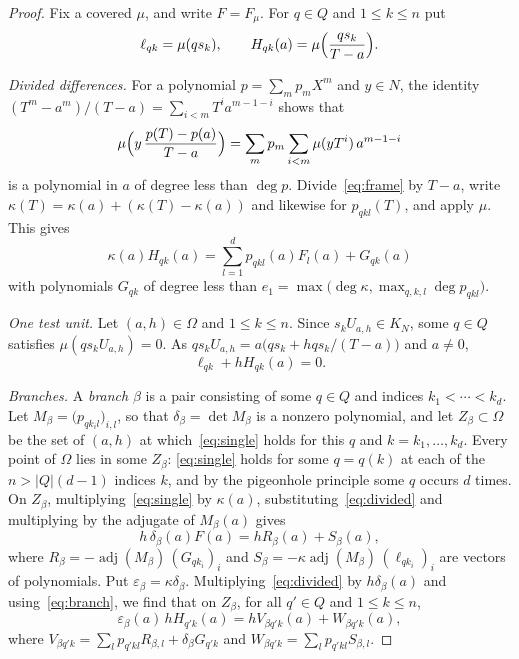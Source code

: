 \documentclass[10pt]{article}
\theoremstyle{remark}
\DeclareMathOperator{\adj}{adj}
\begin{document}
\begin{proof}
Fix a covered $\mu$, and write $F=F_\mu$. For $q\in Q$ and $1\le k\le n$ put
\[
 \ell_{qk}=\mu(qs_k),\qquad H_{qk}(a)=\mu\Bigl(\frac{qs_k}{T-a}\Bigr).
\]

\emph{Divided differences.} For a polynomial $p=\sum_m p_mX^m$ and $y\in N$, the identity $(T^m-a^m)/(T-a)=\sum_{i<m}T^ia^{m-1-i}$ shows that
\[
 \mu\Bigl(y\,\frac{p(T)-p(a)}{T-a}\Bigr)=\sum_m p_m\sum_{i<m}\mu(yT^i)\,a^{m-1-i}
\]
is a polynomial in $a$ of degree less than $\deg p$. Divide~\eqref{eq:frame} by $T-a$, write $\kappa(T)=\kappa(a)+(\kappa(T)-\kappa(a))$ and likewise for $p_{qkl}(T)$, and apply $\mu$. This gives
\begin{equation}\label{eq:divided}
 \kappa(a)H_{qk}(a)=\sum_{l=1}^dp_{qkl}(a)F_l(a)+G_{qk}(a)
\end{equation}
with polynomials $G_{qk}$ of degree less than $e_1=\max\bigl(\deg\kappa,\max_{q,k,l}\deg p_{qkl}\bigr)$.

\emph{One test unit.} Let $(a,h)\in\Omega$ and $1\le k\le n$. Since $s_kU_{a,h}\in K_N$, some $q\in Q$ satisfies $\mu(qs_kU_{a,h})=0$. As $qs_kU_{a,h}=a\bigl(qs_k+hqs_k/(T-a)\bigr)$ and $a\ne0$,
\begin{equation}\label{eq:single}
 \ell_{qk}+hH_{qk}(a)=0.
\end{equation}

\emph{Branches.} A \emph{branch} $\beta$ is a pair consisting of some $q\in Q$ and indices $k_1<\cdots<k_d$. Let $M_\beta=\bigl(p_{qk_il}\bigr)_{i,l}$, so that $\delta_\beta=\det M_\beta$ is a nonzero polynomial, and let $Z_\beta\subset\Omega$ be the set of $(a,h)$ at which~\eqref{eq:single} holds for this $q$ and $k=k_1,\ldots,k_d$. Every point of $\Omega$ lies in some $Z_\beta$: \eqref{eq:single} holds for some $q=q(k)$ at each of the $n>|Q|(d-1)$ indices $k$, and by the pigeonhole principle some $q$ occurs $d$ times. On $Z_\beta$, multiplying~\eqref{eq:single} by $\kappa(a)$, substituting~\eqref{eq:divided} and multiplying by the adjugate of $M_\beta(a)$ gives
\begin{equation}\label{eq:branch}
 h\,\delta_\beta(a)F(a)=hR_\beta(a)+S_\beta(a),
\end{equation}
where $R_\beta=-\adj(M_\beta)\,(G_{qk_i})_i$ and $S_\beta=-\kappa\adj(M_\beta)\,(\ell_{qk_i})_i$ are vectors of polynomials. Put $\varepsilon_\beta=\kappa\delta_\beta$. Multiplying~\eqref{eq:divided} by $h\delta_\beta(a)$ and using~\eqref{eq:branch}, we find that on $Z_\beta$, for all $q'\in Q$ and $1\le k\le n$,
\begin{equation}\label{eq:branchH}
 \varepsilon_\beta(a)\,hH_{q'k}(a)=hV_{\beta q'k}(a)+W_{\beta q'k}(a),
\end{equation}
where $V_{\beta q'k}=\sum_lp_{q'kl}R_{\beta,l}+\delta_\beta G_{q'k}$ and $W_{\beta q'k}=\sum_lp_{q'kl}S_{\beta,l}$.


\end{proof}
\end{document}
